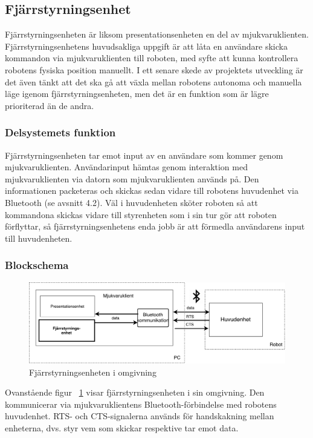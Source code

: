 \documentclass{article}
\begin{document}
\clearpage

\subsection{Fjärrstyrningsenhet}
Fjärrstyrningsenheten är liksom presentationsenheten en del av mjukvaruklienten. Fjärrstyrningsenhetens huvudsakliga uppgift är att låta en användare skicka kommandon via mjukvaruklienten till roboten, med syfte att kunna kontrollera robotens fysiska position manuellt. I ett senare skede av projektets utveckling är det även tänkt att det ska gå att växla mellan robotens autonoma och manuella läge igenom fjärrstyrningsenheten, men det är en funktion som är lägre prioriterad än de andra.

\subsubsection{Delsystemets funktion}
Fjärrstyrningsenheten tar emot input av en användare som kommer genom mjukvaruklienten. Användarinput hämtas genom interaktion med mjukvaruklienten via datorn som mjukvaruklienten används på. Den informationen packeteras och skickas sedan vidare till robotens huvudenhet via Bluetooth (se avsnitt 4.2). Väl i huvudenheten sköter roboten så att kommandona skickas vidare till styrenheten som i sin tur gör att roboten förflyttar, så fjärrstyrningsenhetens enda jobb är att förmedla användarens input till huvudenheten.


\subsubsection{Blockschema}
\begin{figure}[H]
\centering 
\includegraphics[scale=0.37]{Oversikt_fjarrstyrenhet3}
\caption{Fjärrstyrningsenheten i omgivning}
\label{fig:Oversikt_fjarrstyrenhet3}
\end{figure}
Ovanstående figur ~\ref{fig:Oversikt_fjarrstyrenhet3} visar fjärrstyrningsenheten i sin omgivning. Den kommunicerar via mjukvaruklientens Bluetooth-förbindelse med robotens huvudenhet. RTS- och CTS-signalerna används för handskakning mellan enheterna, dvs. styr vem som skickar respektive tar emot data.  
\end{document}
